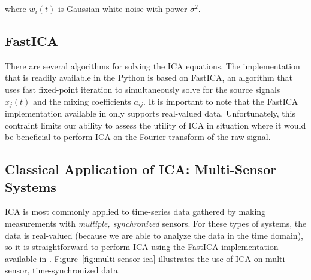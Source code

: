 \documentclass[10pt]{article}
\begin{document}
\noindent where $w_i(t)$ is Gaussian white noise with power $\sigma^2$.

\subsection*{FastICA}
There are several algorithms for solving the ICA equations. The implementation that is
readily available in the  Python is based on FastICA\cite{hyvarinen:1999,
sklearn-fastica}, an algorithm that uses fast fixed-point iteration to simultaneously
solve for the source signals $x_j(t)$ and the mixing coefficients $a_{ij}$. It is
important to note that the FastICA implementation available in  only
supports real-valued data. Unfortunately, this contraint limits our ability to assess
the utility of ICA in situation where it would be beneficial to perform ICA on the Fourier
transform of the raw signal.

\subsection*{Classical Application of ICA: Multi-Sensor Systems}
ICA is most commonly applied to time-series data gathered by making measurements with
\emph{multiple, synchronized} sensors. For these types of systems, the data is real-valued
(because we are able to analyze the data in the time domain), so it is straightforward to
perform ICA using the FastICA implementation available in .
Figure~\ref{fig:multi-sensor-ica} illustrates the use of ICA on multi-sensor,
time-synchronized data.
\end{document}
